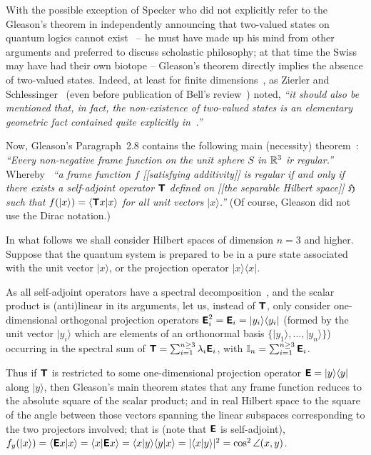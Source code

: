 \documentclass[%
  twocolumn,
 showpacs,
 showkeys,
 preprintnumbers,
 amsmath,amssymb,
 aps,
  pra,
  longbibliography,
 floatfix,
 ]{revtex4-1}
\begin{document}
With the possible exception of Specker who did not explicitly refer to the Gleason's theorem
in independently announcing that two-valued states on quantum logics cannot exist~\cite{specker-60}
-- he must have made up his mind from other arguments and preferred to discuss scholastic philosophy;
at that time the Swiss may have had their own biotope --
Gleason's theorem directly implies the absence of two-valued states.
Indeed, at least for finite dimensions~\cite{Alda,Alda2},
as Zierler and Schlessinger~\cite[p.~259, Example~3.2]{ZirlSchl-65} (even before publication of Bell's review~\cite{bell-66}) noted,
 {\em ``it should also be mentioned that, in fact, the non-existence of two-valued states is an elementary
geometric fact contained quite explicitly in~\cite[Paragraph~2.8]{Gleason}.''}

Now, Gleason's Paragraph~2.8 contains the following main (necessity) theorem~\cite[p.~888]{Gleason}:
{\em ``Every non-negative frame function on the unit sphere $S$ in ${\Bbb R}^3$
ir regular.''}
Whereby~\cite[p.~886]{Gleason}
{\em ``a frame function $f$ [[satisfying additivity]]
is regular if and only if there exists a self-adjoint
operator $\textsf{\textbf{T}}$ defined on [[the separable Hilbert space]] $\mathfrak{H}$ such that
$f( \vert x \rangle ) = \langle \textsf{\textbf{T}}x \vert x\rangle$ for all unit vectors $ \vert x \rangle $.''}
(Of course, Gleason did not use the Dirac notation.)

In what follows we shall consider Hilbert spaces of dimension $n=3$ and higher.
Suppose that the quantum system is prepared to be in a
pure state associated with the unit vector $\vert x \rangle$,
or the projection operator $\vert x \rangle \langle x \vert$.

As all self-adjoint operators have a spectral decomposition~\cite[{\S}~79]{halmos-vs},
and the scalar product is (anti)linear in its arguments,
let us, instead of $\textsf{\textbf{T}}$, only consider one-dimensional orthogonal projection operators
$\textsf{\textbf{E}}_i^2=\textsf{\textbf{E}}_i = \vert y_i \rangle \langle y_i \vert$
(formed by the unit vector $ \vert y_i \rangle $ which are elements of an orthonormal basis
$\{  \vert y_1 \rangle , \ldots ,  \vert y_n \rangle \}$)
occurring in the spectral sum of
$\textsf{\textbf{T}}=\sum_{i=1}^{n\ge 3} \lambda_i \textsf{\textbf{E}}_i$,
with
${\Bbb I}_n =\sum_{i=1}^{n\ge 3} \textsf{\textbf{E}}_i$.

Thus if $\textsf{\textbf{T}}$ is restricted to some one-dimensional projection operator
$\textsf{\textbf{E}} = \vert y \rangle \langle y \vert$ along $\vert y \rangle $,
then Gleason's main theorem
states that any frame function
reduces to the absolute square of the scalar product;
and in real Hilbert space to the square of the angle between those vectors spanning the linear subspaces corresponding to the two projectors involved;
that is (note that $\textsf{\textbf{E}}$ is self-adjoint),
$f_y( \vert x \rangle ) =
\langle \textsf{\textbf{E}}x \vert x\rangle  =
\langle x \vert \textsf{\textbf{E}} x\rangle  =
\langle x \vert y \rangle \langle y \vert x\rangle  =
\vert \langle x \vert y \rangle
\vert^2 = \cos^2 \angle (x,y)$.
\end{document}
